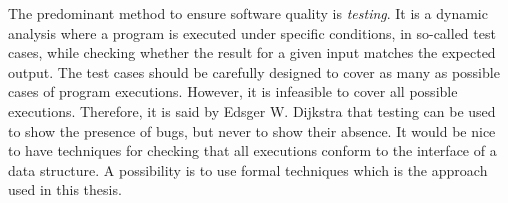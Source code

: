 The predominant method to ensure software quality is
\emph{testing}. It is a dynamic analysis where a program is executed under specific conditions, in so-called test cases, while checking whether the result for a given input matches the expected output.
%
The test cases should be carefully designed to cover as many as possible cases of program executions.
However, it is infeasible to cover all possible executions. Therefore, it is said by Edsger W. Dijkstra that testing can be used to show the presence of bugs, but never to show their absence. 
It would be nice to have techniques for checking that all executions conform to the interface of a data structure.
A possibility is to use formal techniques which is the approach used in this thesis.
%
%
%

